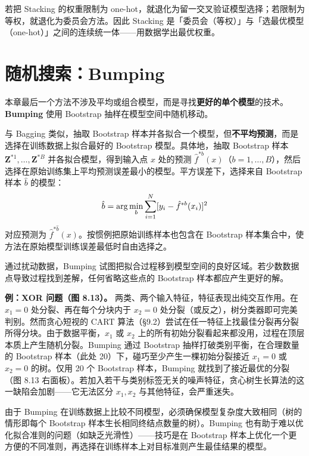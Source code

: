 \begin{remark}
    若把 Stacking 的权重限制为 one-hot，就退化为留一交叉验证模型选择；若限制为等权，就退化为委员会方法。因此 Stacking 是「委员会（等权）」与「选最优模型（one-hot）」之间的连续统一体——用数据学出最优权重。
\end{remark}

\section{随机搜索：Bumping}

本章最后一个方法不涉及平均或组合模型，而是寻找\textbf{更好的单个模型}的技术。\textbf{Bumping} 使用 Bootstrap 抽样在模型空间中随机移动。

与 Bagging 类似，抽取 Bootstrap 样本并各拟合一个模型，但\textbf{不平均预测}，而是选择在训练数据上拟合最好的 Bootstrap 模型。具体地，抽取 Bootstrap 样本 $\mathbf{Z}^{*1}, \ldots, \mathbf{Z}^{*B}$ 并各拟合模型，得到输入点 $x$ 处的预测 $\hat{f}^{*b}(x)$（$b = 1, \ldots, B$），然后选择在原始训练集上平均预测误差最小的模型。平方误差下，选择来自 Bootstrap 样本 $\hat{b}$ 的模型：
\begin{equation}\label{eq:8_60}
    \hat{b} = \arg\min_b \sum_{i=1}^{N}[y_i - \hat{f}^{*b}(x_i)]^2
\end{equation}
对应预测为 $\hat{f}^{*\hat{b}}(x)$。按惯例把原始训练样本也包含在 Bootstrap 样本集合中，使方法在原始模型训练误差最低时自由选择之。

\begin{remark}
    通过扰动数据，Bumping 试图把拟合过程移到模型空间的良好区域。若少数数据点导致过程找到差解，任何省略这些点的 Bootstrap 样本都应产生更好的解。
\end{remark}

\textbf{例：XOR 问题（图 8.13）。} 两类、两个输入特征，特征表现出纯交互作用。在 $x_1 = 0$ 处分裂、再在每个分块内于 $x_2 = 0$ 处分裂（或反之），树分类器即可完美判别。然而贪心短视的 CART 算法（§9.2）尝试在任一特征上找最佳分裂再分裂所得分块。由于数据平衡，$x_1$ 或 $x_2$ 上的所有初始分裂看起来都没用，过程在顶层本质上产生随机分裂。Bumping 通过 Bootstrap 抽样打破类别平衡，在合理数量的 Bootstrap 样本（此处 20）下，碰巧至少产生一棵初始分裂接近 $x_1 = 0$ 或 $x_2 = 0$ 的树。仅用 20 个 Bootstrap 样本，Bumping 就找到了接近最优的分裂（图 8.13 右面板）。若加入若干与类别标签无关的噪声特征，贪心树生长算法的这一缺陷会加剧——它无法区分 $x_1, x_2$ 与其他特征，会严重迷失。

\begin{remark}
    由于 Bumping 在训练数据上比较不同模型，必须确保模型复杂度大致相同（树的情形即每个 Bootstrap 样本生长相同终结点数量的树）。Bumping 也有助于难以优化拟合准则的问题（如缺乏光滑性）——技巧是在 Bootstrap 样本上优化一个更方便的不同准则，再选择在训练样本上对目标准则产生最佳结果的模型。
\end{remark}

